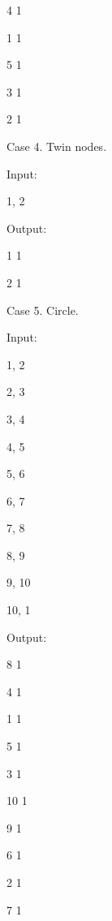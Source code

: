 \begin{itemize*}
4	1

1	1

5	1

3	1

2	1

\item{Case 4. Twin nodes.}

Input:

1, 2

Output:

1	1

2	1

\item{Case 5. Circle.}

Input:

1, 2

2, 3

3, 4

4, 5

5, 6

6, 7

7, 8

8, 9

9, 10

10, 1

Output:

8	1

4	1

1	1

5	1

3	1

10	1

9	1

6	1

2	1

7	1
\end{itemize*}

